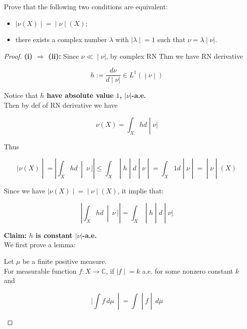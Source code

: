 \documentclass{qlnotes-export}
\begin{document}
Prove that the following two conditions are equivalent:

\begin{itemize}
\item
  \(\left. |\nu(X) \middle| = \middle| \nu \middle| (X) \right.\);
\item
  there exists a complex number \(\lambda\) with \(\left. |\lambda \middle| = 1 \right.\) such that \(\left. \nu = \lambda \middle| \nu| \right.\).
\end{itemize}

\begin{proof}

\textbf{(i) \(\Longrightarrow\) (ii):} Since \(\left. \nu \ll \middle| \nu| \right.\), by complex RN Thm we have RN derivative

\[\left. h := \frac{d\nu}{\left. d \middle| \nu| \right.} \in L^{1}( \middle| \nu \middle| ) \right.\]

Notice that \textbf{\(h\) have absolute value \(1\), \(|\nu|\)-a.e.}\\
Then by def of RN derivative we have

\[\left. \nu(X) = \int_{X}hd \middle| \nu| \right.\]

Thus

\[\left. |\nu(X) \middle| = \left| \int_{X}hd\  \middle| \ \nu\ | \right| \leq \int_{X} \middle| h \middle| d \middle| \nu \middle| = \int_{X}1d \middle| \nu \middle| = \middle| \nu \middle| (X) \right.\]

Since we have \(\left. |\nu(X) \middle| = \middle| \nu \middle| (X) \right.\), it implie that:

\[\left. \left| \int_{X}hd\  \middle| \ \nu\ | \right| = \int_{X} \middle| h \middle| d \middle| \nu| \right.\]

\textbf{Claim: \(h\) is constant \(|\nu|\)-a.e.}\\
We first prove a lemma:

\begin{lemma}\label{lem-hw10-on-lrn-theorem-complex-measure-lemma-001}

Let \(\mu\) be a finite positive measure.\\
For measurable function \(f:X\rightarrow{\mathbb{C}}\), if \(\left. |f \middle| = k \right.\) a.e. for some nonzero constant \(k\) and

\[\left. |\int f\, d\mu\  \middle| = \int \middle| f \middle| \, d\mu \right.\]


\end{lemma}
\end{proof}
\end{document}
